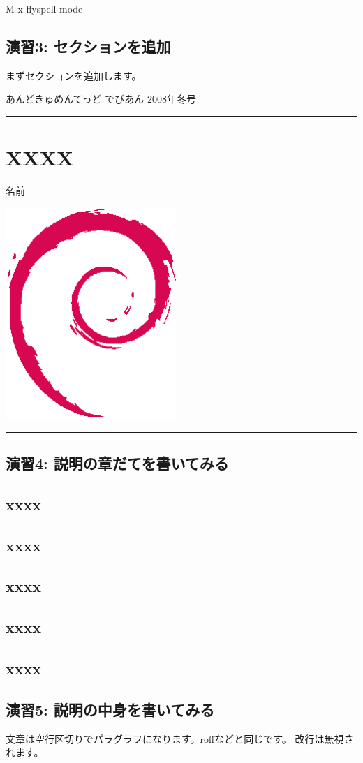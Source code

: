 \documentclass[mingoth,a4paper]{jsarticle}
\renewcommand{\dancersection}[2]{%
\newpage
あんどきゅめんてっど でびあん 2008年冬号
%
\vspace{0.1mm}\\
{\color{dancerlightblue}\rule{\hsize}{2mm}}

%
%
\begin{minipage}[t]{0.6\hsize}
\color{dancerdarkblue}
\vspace{1cm}
\section{#1}
\hfill{}#2\\
\end{minipage}
\begin{minipage}[t]{0.4\hsize}
\vspace{-2cm}
\hfill{}\includegraphics[height=8cm]{image200502/openlogo-nd.eps}\\
\vspace{-5cm}
\end{minipage}
%
%
{\color{dancerdarkblue}\rule{0.74\hsize}{2mm}}
%
\vspace{2cm}
}
\begin{document}
\begin{commandline}
M-x flyspell-mode
\end{commandline}

\subsection{演習3: セクションを追加}

まずセクションを追加します。

\begin{commandline}
 \dancersection{XXXX}{名前}
 \label{XXXX@YYYY}


\end{commandline}

\subsection{演習4: 説明の章だてを書いてみる}

\begin{commandline}

\subsection{xxxx}

\subsection{xxxx}

\subsection{xxxx}

\subsection{xxxx}

\subsection{xxxx}

\end{commandline}

\subsection{演習5: 説明の中身を書いてみる}

文章は空行区切りでパラグラフになります。roffなどと同じです。
改行は無視されます。
\end{document}
